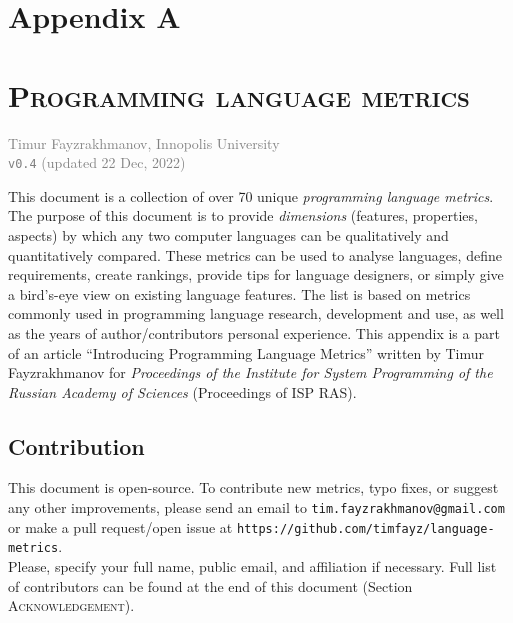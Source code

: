 \documentclass[11pt]{article}
\begin{document}
\twocolumn

\section*{Appendix A}
\label{sec:metrics-table}
\vspace{-0.8em}
\section*{\normalsize\textsc{Programming language metrics}}
\vspace{-0.5em}
\textcolor{gray}{
    \small Timur Fayzrakhmanov, Innopolis University\\
    \texttt{v0.4} (updated 22 Dec, 2022)
}

\bigskip

\noindent 
This document is a collection of over 70 unique \textit{programming language metrics}. The purpose of this document is to provide \textit{dimensions} (features, properties, aspects) by which any two computer languages can be qualitatively and quantitatively compared. These metrics can be used to analyse languages, define requirements, create rankings, provide tips for language designers, or simply give a bird's-eye view on existing language features. The list is based on metrics commonly used in programming language research, development and use, as well as the years of author/contributors personal experience.
This appendix is a part of an article ``Introducing Programming Language Metrics'' written by Timur Fayzrakhmanov for \textit{Proceedings of the Institute for System Programming of the Russian Academy of Sciences} (Proceedings of ISP RAS).



\subsection*{Contribution}
This document is open-source. To contribute new metrics, typo fixes, or suggest any other improvements, please send an email to \texttt{\small tim.\-fayzrakhmanov\-@gmail.com} or make a pull request/open issue at \texttt{\small https://\-github.com/\-timfayz/\-language-\-metrics}.\\
Please, specify your full name, public email, and affiliation if necessary. Full list of contributors can be found at the end of this document (Section \textsc{Acknowledgement}). 
\end{document}
